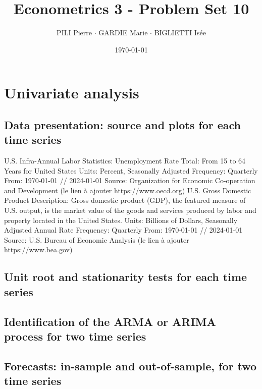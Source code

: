 \documentclass[12pt]{article}
\title{Econometrics 3 - Problem Set 10}
\author{PILI Pierre $\cdot$ GARDIE Marie $\cdot$ BIGLIETTI Isée}
\date{\today}
\begin{document}
\maketitle

\section{Univariate analysis}
\subsection{Data presentation: source and plots for each time series}
U.S. Infra-Annual Labor Statistics: Unemployment Rate Total: From 15 to 64 Years for United States
Units: Percent, Seasonally Adjusted 
Frequency: Quarterly
From: 1970-01-01 // 2024-01-01
Source: Organization for Economic Co-operation and Development (le lien à ajouter https://www.oecd.org)
U.S. Gross Domestic Product
Description: Gross domestic product (GDP), the featured measure of U.S. output, is the market value of the goods and services 
produced by labor and property located in the United States.
Units: Billions of Dollars, Seasonally Adjusted Annual Rate
Frequency: Quarterly
From: 1970-01-01 // 2024-01-01
Source: U.S. Bureau of Economic Analysis (le lien à ajouter https://www.bea.gov)

\subsection{Unit root and stationarity tests for each time series}

\subsection{Identification of the ARMA or ARIMA process for two time series}

\subsection{Forecasts: in-sample and out-of-sample, for two time series}
\end{document}
